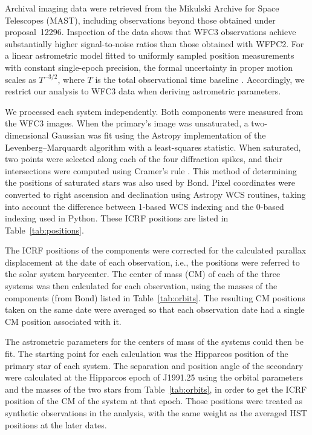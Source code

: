 \documentclass[linenumbers,trackchanges]{aastex701}
\begin{document}
Archival imaging data were retrieved from the Mikulski Archive for Space Telescopes (MAST), including observations
beyond those obtained under proposal~12296. Inspection of the data shows that WFC3 observations achieve substantially
higher signal-to-noise ratios than those obtained with WFPC2. For a linear astrometric model fitted to uniformly sampled
position measurements with constant single-epoch precision, the formal uncertainty in proper motion scales as
$T^{-3/2}$, where $T$ is the total observational time baseline
\citep{Wielen1997,vanLeeuwen2007,Lindegren2021}. Accordingly, we restrict our analysis to WFC3 data when deriving
astrometric parameters. 

We processed each system independently. Both components were measured from the WFC3 images. When the primary's
image was unsaturated, a two-dimensional Gaussian was fit using the Astropy implementation of the Levenberg–Marquardt
algorithm with a least-squares statistic. When saturated, two points were selected along each of the four diffraction
spikes, and their intersections were computed using Cramer's rule \citep{Cramer1750}. This method of determining the
positions of saturated stars was also used by
Bond\citep{2017ApJ...840...70B,2015ApJ...813..106B,2020ApJ...904..112B,Bond_2018}. Pixel coordinates were converted to right
ascension and declination using Astropy WCS routines, taking into account the difference between 1-based WCS indexing
and the 0-based indexing used in Python. These ICRF positions are listed in Table~\ref{tab:positions}. 

The ICRF positions of the components were corrected for the calculated parallax displacement at the date of each
observation, i.e., the positions were referred to the solar system barycenter. The center of mass (CM) of each of the
three systems was then calculated for each observation, using the masses of the components (from Bond) listed in
Table~\ref{tab:orbits}. The resulting CM positions taken on the same date were averaged so that each observation date
had a single CM position associated with it.

The astrometric parameters for the centers of mass of the systems could then be fit. The starting point for each
calculation was the Hipparcos position of the primary star of each system. The separation and position angle of the
secondary were calculated at the Hipparcos epoch of J1991.25 using the orbital parameters and the masses of the two stars
from Table~\ref{tab:orbits}, in order to get the ICRF position of the CM of the system at that epoch. Those positions
were treated as synthetic observations in the analysis, with the same weight as the averaged HST positions at the later
dates.
\end{document}

